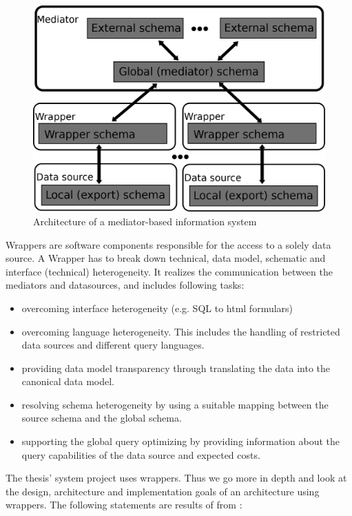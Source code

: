 \begin{figure}[H]
	\begin{center}
		\includegraphics[scale=0.5]{figures/MediatorBasedArchitecture.png}
	\end{center}
	\caption{Architecture of a  mediator-based information system \cite[p. 97]{DBLP:books/dp/LeserN2006}}
	\label{MediatorBasedArchitecture}
\end{figure}

Wrappers are software components responsible for the access to a solely data source.
A Wrapper has to break down technical, data model, schematic and interface (technical) heterogeneity. It realizes the communication between the mediators and datasources, and includes following tasks:

\begin{itemize}
\item overcoming interface heterogeneity (e.g. SQL to html formulars)
\item overcoming language heterogeneity. This includes the handling of restricted data sources and different query languages.
\item providing data model transparency through translating the data into the canonical data model.
\item resolving schema heterogeneity by using a suitable mapping between the source schema and the global schema.
\item supporting the global query optimizing by providing information about the query capabilities of the data source and expected costs.
\end{itemize}

The thesis' system project uses wrappers. Thus we go more in depth and look at the design, architecture and implementation goals of an architecture using wrappers. The following statements are results of from \cite{Roth:1997:DSW:645923.670992}:

